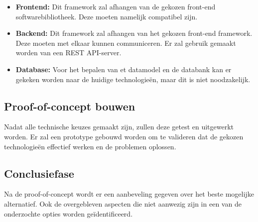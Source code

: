 \begin{itemize} 
    \item \textbf{Frontend:} Dit framework zal afhangen van de gekozen front-end softwarebibliotheek. Deze moeten namelijk compatibel zijn.
    \item \textbf{Backend:} Dit framework zal afhangen van het gekozen front-end framework. Deze m\-oeten met elkaar kunnen communiceren. Er zal gebruik gemaakt worden van een REST API-server.
    \item \textbf{Database:} Voor het bepalen van et datamodel en de databank kan er gekeken worden naar de huidige technologieën, maar dit is niet noodzakelijk.
\end{itemize}

\subsection{Proof-of-concept bouwen}
Nadat alle technische keuzes gemaakt zijn, zu\-llen deze getest en uitgewerkt worden. Er zal een prototype gebouwd worden om te valideren dat de gekozen technologieën effectief werken en de problemen oplossen.

\subsection{Conclusiefase}
Na de proof-of-concept wordt er een aanbeveling gegeven over het beste mogelijke alternatief. Ook de overgebleven  aspecten die niet aanwezig zijn in een van de onderzochte opties worden geïdentificeerd.

%
%
%
%
%

